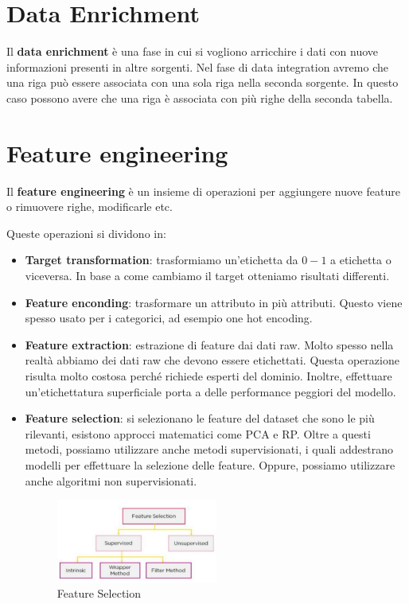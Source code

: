 \section{Data Enrichment}
Il \textbf{data enrichment} è una fase in cui si vogliono arricchire i dati con
nuove informazioni presenti in altre sorgenti. Nel fase di data integration
avremo che una riga può essere associata con una sola riga nella seconda sorgente.
In questo caso possono avere che una riga è associata con più righe della seconda
tabella.

\section{Feature engineering}
Il \textbf{feature engineering} è un insieme di operazioni per aggiungere nuove
feature o rimuovere righe, modificarle etc.

Queste operazioni si dividono in:
\begin{itemize}
      \item \textbf{Target transformation}: trasformiamo un'etichetta da $0-1$ a
            etichetta o viceversa. In base a come cambiamo il target otteniamo
            risultati differenti.
      \item \textbf{Feature enconding}: trasformare un attributo in più attributi.
            Questo viene spesso usato per i categorici, ad esempio one hot encoding.
      \item \textbf{Feature extraction}: estrazione di feature dai dati raw.
            Molto spesso nella realtà abbiamo dei dati raw che devono essere
            etichettati. Questa operazione risulta molto costosa perché richiede
            esperti del dominio. Inoltre, effettuare un'etichettatura superficiale
            porta a delle performance peggiori del modello.
      \item \textbf{Feature selection}: si selezionano le feature del dataset
            che sono le più rilevanti, esistono approcci matematici come PCA e RP.
            Oltre a questi metodi, possiamo utilizzare anche metodi supervisionati,
            i quali addestrano modelli per effettuare la selezione delle feature.
            Oppure, possiamo utilizzare anche algoritmi non supervisionati.
            \begin{figure}[!ht]
                  \centering
                  \includegraphics[width=0.5\textwidth]{./img/MLops/feature_selection.png}
                  \caption{Feature Selection}
                  \label{fig:feature_selection}
            \end{figure}
\end{itemize}
